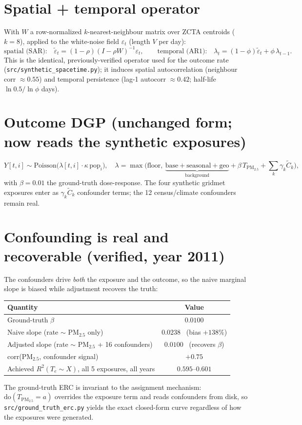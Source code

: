 \documentclass[11pt]{article}
\newcommand{\code}[1]{\texttt{\small #1}}
\begin{document}
\section{Spatial + temporal operator}\label{sec:st}
With $W$ a row-normalized $k$-nearest-neighbour matrix over ZCTA centroids ($k{=}8$), applied to the
white-noise field $\varepsilon_t$ (length $V$ per day):
\[
  \text{spatial (SAR):}\quad \tilde\varepsilon_t=(1-\rho)(I-\rho W)^{-1}\varepsilon_t,\qquad
  \text{temporal (AR1):}\quad \lambda_t=(1-\phi)\tilde\varepsilon_t+\phi\,\lambda_{t-1}.
\]
This is the identical, previously-verified operator used for the outcome rate
(\code{src/synthetic\_spacetime.py}); it induces spatial autocorrelation (neighbour corr $\approx 0.55$)
and temporal persistence (lag-1 autocorr $\approx 0.42$; half-life $\ln 0.5/\ln\phi$ days).

\section{Outcome DGP (unchanged form; now reads the synthetic exposures)}
\[
  Y[t,i]\sim\text{Poisson}\!\big(\lambda[t,i]\cdot\kappa\,\text{pop}_i\big),\quad
  \lambda=\max\!\Big(\text{floor},\ \underbrace{\text{base}+\text{seasonal}+\text{geo}}_{\text{background}}
   +\beta\,T_{\text{PM}_{2.5}}+\textstyle\sum_k\gamma_k\tilde C_k\Big),
\]
with $\beta=0.01$ the ground-truth dose-response. The four synthetic gridmet exposures enter as
$\gamma_k\tilde C_k$ confounder terms; the 12 census/climate confounders remain real.

\section{Confounding is real and recoverable (verified, year 2011)}
The confounders drive \emph{both} the exposure and the outcome, so the naive marginal slope is biased
while adjustment recovers the truth:
\begin{center}\small
\begin{tabular}{lc}
\toprule
Quantity & Value \\
\midrule
Ground-truth $\beta$ & $0.0100$ \\
Naive slope (rate $\sim$ PM$_{2.5}$ only) & $0.0238$ \ (bias $+138\%$) \\
Adjusted slope (rate $\sim$ PM$_{2.5}$ + 16 confounders) & $0.0100$ \ (recovers $\beta$) \\
corr(PM$_{2.5}$, confounder signal) & $+0.75$ \\
Achieved $R^2(T_e\sim X)$, all 5 exposures, all years & $0.595\text{--}0.601$ \\
\bottomrule
\end{tabular}
\end{center}
The ground-truth ERC is invariant to the assignment mechanism: $\mathrm{do}(T_{\text{PM}_{2.5}}=a)$
overrides the exposure term and reads confounders from disk, so
\code{src/ground\_truth\_erc.py} yields the exact closed-form curve regardless of how the exposures were
generated.
\end{document}
